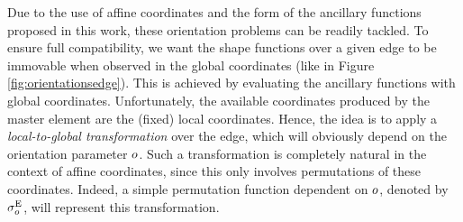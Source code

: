 


Due to the use of affine coordinates and the form of the ancillary functions proposed in this work, these orientation problems can be readily tackled.
To ensure full compatibility, we want the shape functions over a given edge to be immovable when observed in the global coordinates (like in Figure \ref{fig:orientationsedge}).
This is achieved by evaluating the ancillary functions with global coordinates.
Unfortunately, the available coordinates produced by the master element are the (fixed) local coordinates.
Hence, the idea is to apply a \textit{local-to-global transformation} over the edge, which will obviously depend on the orientation parameter $o$. 
Such a transformation is completely natural in the context of affine coordinates, since this only involves permutations of these coordinates.
Indeed, a simple permutation function dependent on $o$, denoted by $\sigma_o^{\mathrm{E}}$, will represent this transformation.

